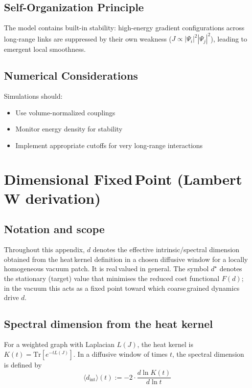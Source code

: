 \documentclass[11pt]{article}
\begin{document}
\subsection{Self-Organization Principle}

The model contains built-in stability: high-energy gradient configurations across long-range links are suppressed by their own weakness ($J \propto |\Psi_i|^2|\Psi_j|^2$), leading to emergent local smoothness.

\subsection{Numerical Considerations}

Simulations should:
\begin{itemize}
\item Use volume-normalized couplings
\item Monitor energy density for stability
\item Implement appropriate cutoffs for very long-range interactions
\end{itemize}

\section{Dimensional Fixed\,Point (Lambert\,W derivation)}\label{si:dim-fp}

\subsection{Notation and scope}

Throughout this appendix, $d$ denotes the effective intrinsic/spectral dimension obtained from the heat\,kernel definition in a chosen diffusive window for a locally homogeneous vacuum patch. It is real\,valued in general. The symbol $d^\star$ denotes the stationary (target) value that minimises the reduced cost functional $F(d)$; in the vacuum this acts as a fixed point toward which coarse\,grained dynamics drive $d$.

\subsection{Spectral dimension from the heat kernel}

For a weighted graph with Laplacian $L(J)$, the heat kernel is $K(t) = \text{Tr}[e^{-t L(J)}]$. In a diffusive window of times $t$, the spectral dimension is defined by
\begin{equation}
\langle d_{\text{int}} \rangle(t) := - 2 \cdot \frac{d \ln K(t)}{d \ln t}
\end{equation}
\end{document}
